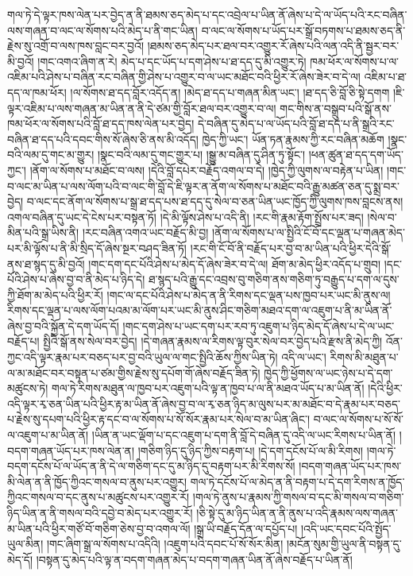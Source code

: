 གལ་ཏེ་དེ་ལྟར་ཁས་ལེན་པར་བྱེད་ན་ནི་ཐམས་ཅད་མེད་པ་དང་འབྲེལ་པ་ཡིན་ནོ་ཞེས་པ་དེ་ལ་ཡོད་པའི་རང་བཞིན་ལས་གཞན་བ་ལང་ལ་སོགས་པའི་མེད་པ་ནི་གང་ཡིན། བ་ལང་ལ་སོགས་པ་ཡོད་པར་སྒྲོ་བཏགས་པ་ཐམས་ཅད་ནི་རྗེས་སུ་འགྲོ་བ་ལས་ཁས་བླང་བར་བྱའོ། །ཐམས་ཅད་མེད་པར་ཐལ་བར་འགྱུར་རོ་ཞེས་པའི་ལན་འདི་ནི་སྦྱར་བར་མི་བྱའོ། །གང་འགའ་ཞིག་ན་རེ། མེད་པ་དང་ཡོད་པ་དག་ཤེས་པ་ཐ་དད་དུ་མི་འགྱུར་ཏེ། ཁམ་ཕོར་ལ་སོགས་པ་ལ་འཇིམ་པའི་ཤེས་པ་བཞིན་རང་བཞིན་གྱི་ཤེས་པ་འགྱུར་བ་ལ་ཡང་མཐོང་བའི་ཕྱིར་རོ་ཞེས་ཟེར་བ་དེ་ལ། འཇིམ་པ་ཐ་དད་ལ་ཁམ་ཕོར། །ལ་སོགས་ཐ་དད་བློར་འདོད་ན། །མེད་ཐ་དད་པ་གཞན་མིན་ཡང་། །ཐ་དད་ཅི་བློ་ཅི་སྟེ་དགག །ཇི་ལྟར་འཇིམ་པ་ལས་གཞན་མ་ཡིན་ན་ནི་དེ་ཙམ་གྱི་བློར་ཐལ་བར་འགྱུར་བ་ལ། གང་གིས་ན་བསྒྲུབ་པའི་སྒོ་ནས་ཁམ་ཕོར་ལ་སོགས་པའི་བློ་ཐ་དད་ཁས་ལེན་པར་བྱེད། དེ་བཞིན་དུ་མེད་པ་ལ་ཡོད་པའི་བློ་ཐ་དད་པ་ནི་སྒྲའི་རང་བཞིན་ཐ་དད་པའི་དབང་གིས་སོ་ཞེས་ཅི་ནས་མི་འདོད། ཁྱེད་ཀྱི་ཡང་། ཡོན་ཏན་རྣམས་ཀྱི་རང་བཞིན་མཆོག །སྣང་བའི་ལམ་དུ་གང་མ་གྱུར། །སྣང་བའི་ལམ་དུ་གང་གྱུར་པ། །སྒྱུ་མ་བཞིན་དུ་ཤིན་ཏུ་སྟོང་། །ཕན་ཚུན་ཐ་དད་དག་ཡོད་ཀྱང་། །ནོག་ལ་སོགས་པ་མཐོང་བ་ལས། །དེའི་བློ་དཔེར་བརྗོད་འགལ་བ་དེ། །ཁྱེད་ཀྱི་ལུགས་ལ་བརྟེན་པ་ཡིན། །གང་བ་ལང་མ་ཡིན་པ་ལས་ལོག་པའི་བ་ལང་གི་བློ་དེ་ཇི་ལྟར་ན་ནོག་ལ་སོགས་པ་མཐོང་བའི་རྒྱུ་མཚན་ཅན་དུ་སྨྲ་བར་བྱེད། བ་ལང་དང་ནོག་ལ་སོགས་པ་སྒྲ་ཐ་དད་པས་ཐ་དད་དུ་སེལ་བ་ཅན་ཡིན་ཡང་ཁྱོད་ཀྱི་ལུགས་ཁས་བླངས་ནས། འགལ་བཞིན་དུ་ཡང་དེ་ངེས་པར་བསྟན་ཏོ། །དེ་མི་ལྟོས་ཤེས་པ་འདི་ནི། །རང་གི་རྣམ་རྟོག་སྤྲོས་པར་ཟད། །སེལ་བ་མིན་པའི་སྒྲ་ཡིས་ནི། །རང་བཞིན་འགའ་ཡང་བརྗོད་མི་བྱ། །ནོག་ལ་སོགས་པ་ལ་སྤྱིའི་ངོ་བོ་དང་ལྡན་པ་གཞན་མེད་པར་མི་ལྟོས་པ་ནི་མི་སྲིད་དོ་ཞེས་སྔར་བཤད་ཟིན་ཏོ། །རང་གི་ངོ་བོ་ནི་བརྗོད་པར་བྱ་བ་མ་ཡིན་པའི་ཕྱིར་དེའི་སྒོ་ནས་ཐ་སྙད་དུ་མི་བྱའོ། །གང་དག་དང་པོའི་ཤེས་པ་མེད་དོ་ཞེས་ཟེར་བ་དེ་ལ། ཐོག་མ་མེད་ཕྱིར་འདོད་པ་གྲུབ། །དང་པོའི་ཤེས་པ་ཞེས་བྱ་བ་ནི་མེད་པ་ཉིད་དེ། ཐ་སྙད་པའི་རྒྱུ་དང་འབྲས་བུ་གཅིག་ནས་གཅིག་ཏུ་བརྒྱུད་པ་དག་ལ་དུས་ཀྱི་ཐོག་མ་མེད་པའི་ཕྱིར་རོ། །གང་ལ་དང་པོའི་ཤེས་པ་མེད་ན་ནི་རིགས་དང་ལྡན་པས་ཁྱབ་པར་ཡང་མི་ནུས་ལ། རིགས་དང་ལྡན་པ་ལས་ལོག་པའམ་མ་ལོག་པར་ཡང་མི་ནུས་ཤིང་གཅིག་མཐའ་དག་ལ་འཇུག་པ་ནི་མ་ཡིན་ནོ་ཞེས་བྱ་བའི་སྐྱོན་དེ་དག་ཡོད་དོ། །གང་དག་ཤེས་པ་ཡང་དག་པར་རབ་ཏུ་འཇུག་པ་ཉིད་མེད་དོ་ཞེས་པ་དེ་ལ་ཡང་བརྗོད་པ། སྤྱིའི་སྒོ་ནས་སེལ་བར་བྱེད། །དེ་གཞན་རྣམས་ལ་རིགས་ལྟ་བུར་སེལ་བར་བྱེད་པའི་རྫས་ནི་མེད་ཀྱི། འོན་ཀྱང་འདི་ལྟར་རྣམ་པར་བཅད་པར་བྱ་བའི་ཡུལ་ལ་གང་སྤྱིའི་ཆོས་ཀྱིས་ཡིན་ཏེ། འདི་ལ་ཡང་། རིགས་མི་མཐུན་པ་ལ་མ་མཐོང་བར་བསྟན་པ་ཙམ་གྱིས་རྗེས་སུ་དཔོག་གོ་ཞེས་བརྗོད་ཟིན་ཏེ། ཁྱེད་ཀྱི་ཕྱོགས་ལ་ཡང་ཉེས་པ་དེ་དག་མཚུངས་ཏེ། གལ་ཏེ་རིགས་མཐུན་ལ་ཁྱབ་པར་འཇུག་པའི་ལྟ་ན་ཁྱབ་པ་ལ་ནི་མཐའ་ཡོད་པ་མ་ཡིན་ནོ། །དེའི་ཕྱིར་འདི་ལྟར་རྭ་ཅན་ཡིན་པའི་ཕྱིར་རྟ་མ་ཡིན་ནོ་ཞེས་བྱ་བ་ལ་རྭ་ཅན་ཉིད་མ་ལུས་པར་མ་མཐོང་བ་དེ་རྣམ་པར་བཅད་པ་རྗེས་སུ་དཔག་པའི་ཕྱིར་རྟ་དང་བ་ལ་སོགས་པ་སོ་སོར་རྣམ་པར་སེལ་བ་མ་ཡིན་ཞིང་། བ་ལང་ལ་སོགས་པ་སོ་སོ་ལ་འཇུག་པ་མ་ཡིན་ནོ། །ཡིན་ན་ཡང་ལྡོག་པ་དང་འཇུག་པ་དག་ནི་བློ་དེ་བཞིན་དུ་འདི་ལ་ཡང་རིགས་པ་ཡིན་ནོ། །བདག་གཞན་ཡོད་པར་ཁས་ལེན་ན། །གཅིག་ཉིད་དུ་ཉིད་ཀྱིས་བརྟག་པ། །དེ་དག་དངོས་པོ་ལ་མི་རིགས། །གལ་ཏེ་བདག་དངོས་པོ་ལ་ཡོད་ན་ནི་དེ་ལ་གཅིག་དང་དུ་མ་ཉིད་དུ་བརྟག་པར་མི་རིགས་སོ། །བདག་གཞན་ཡོད་པར་ཁས་མི་ལེན་ན་ནི་ཁྱོད་ཀྱིའང་གསལ་བ་ནུས་པར་འགྱུར། གལ་ཏེ་དངོས་པོ་ལ་མེད་ན་ནི་བརྟག་པ་དེ་དག་རིགས་ན་ཁྱོད་ཀྱིའང་གསལ་བ་དང་ནུས་པ་མཚུངས་པར་འགྱུར་རོ། །གལ་ཏེ་ནུས་པ་རྣམས་ཀྱི་གསལ་བ་དང་མི་གསལ་བ་གཅིག་ཉིད་ཡིན་ན་ནི་གསལ་བའི་དབྱེ་བ་མེད་པར་འགྱུར་རོ། །ཅི་སྟེ་དུ་མ་ཉིད་ཡིན་ན་ནི་ནུས་པ་འདི་རྣམས་ལས་གཞན་མ་ཡིན་པའི་ཕྱིར་གཙོ་བོ་གཅིག་ཅེས་བྱ་བ་འགལ་ལོ། །སྒྲ་ཡི་བརྗོད་དོན་ལ་དཔྱོད་པ། །འདི་ཡང་དབང་པོའི་སྤྱོད་ཡུལ་མིན། །གང་ཞིག་སྒྲ་ལ་སོགས་པ་འདིའི། །འཇུག་པའི་དབང་པོ་སོ་སོར་མིན། །མངོན་སུམ་གྱི་ཡུལ་ནི་བསྟན་དུ་མེད་དོ། །བསྟན་དུ་མེད་པའི་ལྟ་ན་བདག་གཞན་མེད་པ་བདག་གཞན་ཡིན་ནོ་ཞེས་བརྗོད་པ་ཡིན་ནོ། 